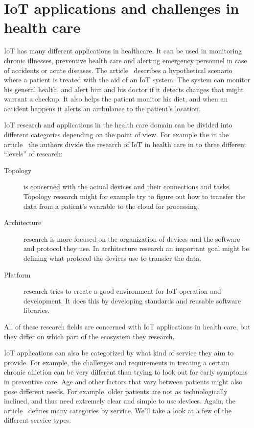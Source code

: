 \section{IoT applications and challenges in health care}
\label{sec:iot-health}

IoT has many different applications in healthcare. It can be used in monitoring
chronic illnesses, preventive health care and alerting emergency personnel in
case of accidents or acute diseases. The article~\cite{Bui2011} describes a
hypothetical scenario where a patient is treated with the aid of an IoT system.
The system can monitor his general health, and alert him and his doctor if it
detects changes that might warrant a checkup. It also helps the patient monitor
his diet, and when an accident happens it alerts an ambulance to the patient's
location.

IoT research and applications in the health care domain can be divided into
different categories depending on the point of view. For example the in the
article~\cite{Islam2015} the authors divide the research of IoT in health care
in to three different ``levels'' of research:

\begin{description}
  \item[Topology] is concerned with the actual devices and their connections
    and tasks. Topology research might for example try to figure out how to
    transfer the data from a patient's wearable to the cloud for processing.

  \item[Architecture] research is more focused on the organization of devices
    and the software and protocol they use. In architecture research an
    important goal might be defining what protocol the devices use to transfer
    the data.

  \item[Platform] research tries to create a good environment for IoT
    operation and development. It does this by developing standards and
    reusable software libraries.

\end{description}

All of these research fields are concerned with IoT applications in health
care, but they differ on which part of the ecosystem they research.

IoT applications can also be categorized by what kind of service they aim to
provide. For example, the challenges and requirements in treating a certain
chronic afliction can be very different than trying to look out for early
symptoms in preventive care. Age and other factors that vary between patients
might also pose different needs. For example, older patients are not as
technologically inclined, and thus need extremely clear and simple to use
devices. Again, the article~\cite{Islam2015} defines many categories by
service. We'll take a look at a few of the different service types:

